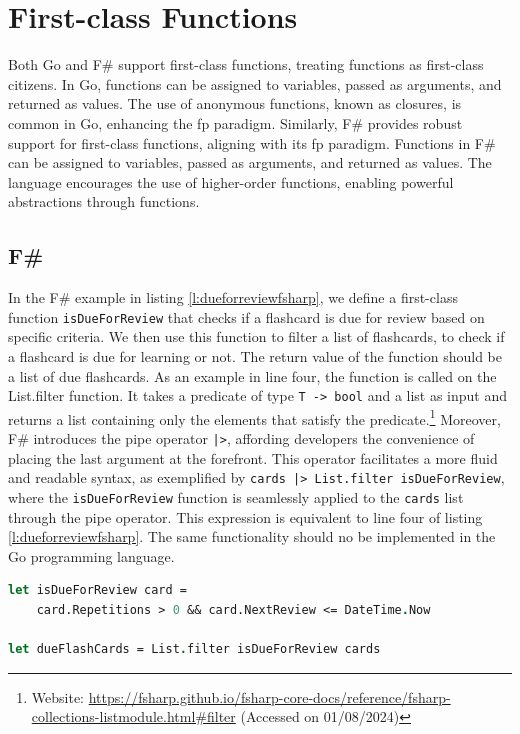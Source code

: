     \section{First-class Functions}\label{sec:first-class-functions}
    Both Go and F\# support first-class functions, treating functions as first-class citizens. In Go, functions can be assigned to variables, passed as arguments, and returned as values. The use of anonymous functions, known as closures, is common in Go, enhancing the \ac{fp} paradigm. Similarly, F\# provides robust support for first-class functions, aligning with its \ac{fp} paradigm. Functions in F\# can be assigned to variables, passed as arguments, and returned as values. The language encourages the use of higher-order functions, enabling powerful abstractions through functions.

    \subsection*{F\#}
    In the F\# example in listing \ref{l:dueforreviewfsharp}, we define a first-class function \texttt{isDueForReview} that checks if a flashcard is due for review based on specific criteria. We then use this function to filter a list of flashcards, to check if a flashcard is due for learning or not. The return value of the function should be a list of due flashcards. As an example in line four, the function is called on the List.filter function. It takes a predicate of type \texttt{T -> bool} and a list as input and returns a list containing only the elements that satisfy the predicate.\footnote{Website: \url{https://fsharp.github.io/fsharp-core-docs/reference/fsharp-collections-listmodule.html\#filter} (Accessed on 01/08/2024)} Moreover, F\# introduces the pipe operator \texttt{|>}, affording developers the convenience of placing the last argument at the forefront. This operator facilitates a more fluid and readable syntax, as exemplified by \texttt{cards |> List.filter isDueForReview}, where the \texttt{isDueForReview} function is seamlessly applied to the \texttt{cards} list through the pipe operator. This expression is equivalent to line four of listing \ref{l:dueforreviewfsharp}. The same functionality should no be implemented in the Go programming language.

\begin{lstlisting}[language=fsharp, firstnumber=1,float=tp, caption={First-class function reresentation in F\#}, label=l:dueforreviewfsharp]
let isDueForReview card =
    card.Repetitions > 0 && card.NextReview <= DateTime.Now
        
let dueFlashCards = List.filter isDueForReview cards
\end{lstlisting}
        

